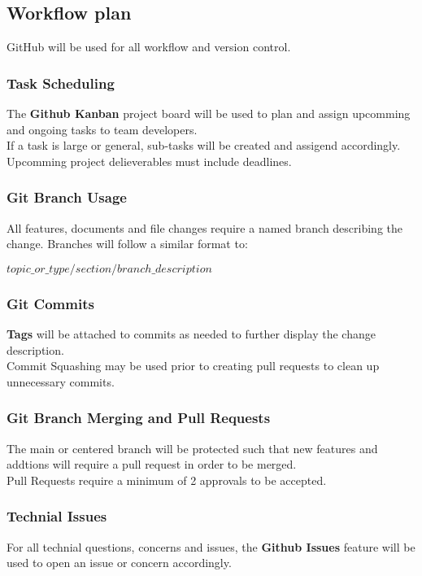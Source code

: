 \documentclass{article}
\begin{document}
\subsection{Workflow plan}
GitHub will be used for all workflow and version control.

\subsubsection{Task Scheduling}
The \textbf{Github Kanban} project board will be used to plan and assign upcomming and ongoing tasks to team developers. \\
If a task is large or general, sub-tasks will be created and assigend accordingly.\\
Upcomming project delieverables must include deadlines.\\

\subsubsection{Git Branch Usage}
All features, documents and file changes require a named branch describing the change.
Branches will follow a similar format to:

\begin{center}
	$topic\_or\_type/section/branch\_description$
\end{center}

\subsubsection{Git Commits}
\textbf{Tags} will be attached to commits as needed to further display the change description.\\
Commit Squashing may be used prior to creating pull requests to clean up unnecessary commits.

\subsubsection{Git Branch Merging and Pull Requests}
The main or centered branch will be protected such that new features and addtions will require a pull request in order to be merged. \\
Pull Requests require a minimum of 2 approvals to be accepted.

\subsubsection{Technial Issues}
For all technial questions, concerns and issues, the \textbf{Github Issues} feature will be used to open an issue or concern accordingly.
\end{document}
